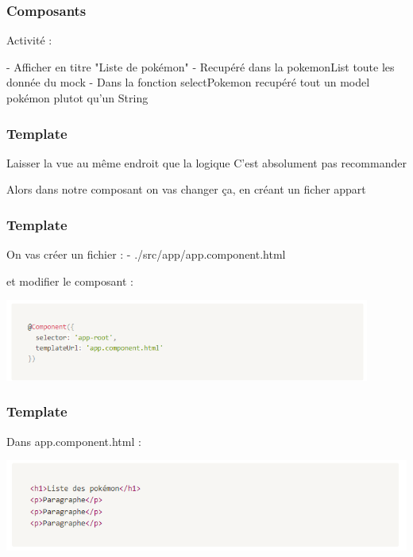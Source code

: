 \documentclass[10pt]{beamer}
\begin{document}
	\begin{frame}
		\frametitle{Composants}

		Activité : \newline \newline

		- Afficher en titre "Liste de pokémon" \newline
		- Recupéré dans la pokemonList toute les donnée du mock \newline
		- Dans la fonction selectPokemon recupéré tout un model pokémon plutot qu'un String \newline

	\end{frame}

	\begin{frame}
		\frametitle{Template}

		Laisser la vue au même endroit que la logique \newline
		C'est absolument pas \alert{recommander} \newline \newline

		Alors dans notre composant on vas changer ça, \newline en créant un ficher appart\newline \newline

	\end{frame}

	\begin{frame}
		\frametitle{Template}

		On vas créer un fichier : \newline
		- ./src/app/app.component.html \newline \newline

		et modifier le composant : \newline


		\centering
		\includegraphics[width=12cm]{assets/templateAsset} \newline

	\end{frame}

	\begin{frame}
		\frametitle{Template}

		Dans app.component.html : \newline

		\centering
		\includegraphics[width=14cm]{assets/templateHtml} \newline

	\end{frame}
\end{document}
